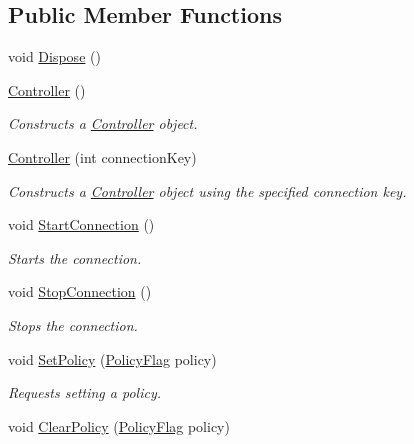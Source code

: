 \subsection*{Public Member Functions}
\begin{DoxyCompactItemize}
\item 
void \mbox{\hyperlink{class_leap_1_1_controller_ad2b8546f002e50164178d1cb7fff4d57}{Dispose}} ()
\item 
\mbox{\hyperlink{class_leap_1_1_controller_a55b80a043ff15459a08b60bf9f85a955}{Controller}} ()
\begin{DoxyCompactList}\small\item\em Constructs a \mbox{\hyperlink{class_leap_1_1_controller}{Controller}} object. \end{DoxyCompactList}\item 
\mbox{\hyperlink{class_leap_1_1_controller_aa96fa3ac415fe7564a7a9578041d5fff}{Controller}} (int connection\+Key)
\begin{DoxyCompactList}\small\item\em Constructs a \mbox{\hyperlink{class_leap_1_1_controller}{Controller}} object using the specified connection key. \end{DoxyCompactList}\item 
void \mbox{\hyperlink{class_leap_1_1_controller_a3e1e2694a23c62c79f9592217529e860}{Start\+Connection}} ()
\begin{DoxyCompactList}\small\item\em Starts the connection. \end{DoxyCompactList}\item 
void \mbox{\hyperlink{class_leap_1_1_controller_a08c17e46012a2774afe1b5901e82ce6a}{Stop\+Connection}} ()
\begin{DoxyCompactList}\small\item\em Stops the connection. \end{DoxyCompactList}\item 
void \mbox{\hyperlink{class_leap_1_1_controller_a7e862547a7ea735203220e43c0e04a85}{Set\+Policy}} (\mbox{\hyperlink{class_leap_1_1_controller_a0bdb49fa94aa2da8b098c1ac296528d6}{Policy\+Flag}} policy)
\begin{DoxyCompactList}\small\item\em Requests setting a policy. \end{DoxyCompactList}\item 
void \mbox{\hyperlink{class_leap_1_1_controller_a78edc0a692fa7200a07eee4b651012a4}{Clear\+Policy}} (\mbox{\hyperlink{class_leap_1_1_controller_a0bdb49fa94aa2da8b098c1ac296528d6}{Policy\+Flag}} policy)

\end{DoxyCompactItemize}
